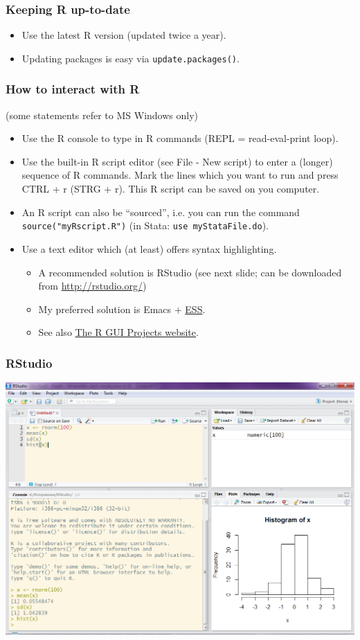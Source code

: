 \documentclass[bigger]{beamer}
\begin{document}
\begin{frame}
\frametitle{Keeping R up-to-date}
\label{sec-2-1-3}

\begin{itemize}
\item Use the latest R version (updated twice a year).
\item Updating packages is easy via \texttt{update.packages()}.
\end{itemize}
\end{frame}
\begin{frame}[shrink=5]
\frametitle{How to interact with R}
\label{sec-2-1-4}

    (some statements refer to MS Windows only)
\begin{itemize}
\item Use the R console to type in R commands (REPL = read-eval-print loop).
\item Use the built-in R script editor (see File - New script) to enter a (longer)
      sequence of R commands. Mark the lines which you want to run and press
      CTRL + r (STRG + r). This R script can be saved on you computer.
\item An R script can also be \enquote{sourced}, i.e. you can run the command
      \texttt{source("myRscript.R")} (in Stata: \texttt{use myStataFile.do}).
\item Use a text editor which (at least) offers syntax highlighting.
\begin{itemize}
\item A recommended solution is RStudio (see next slide; can be downloaded from \href{http://rstudio.org/}{http://rstudio.org/})
\item My preferred solution is Emacs + \href{http://ess.r-project.org/}{ESS}.
\item See also \href{http://www.sciviews.org/_rgui/}{The R GUI Projects website}.
\end{itemize}
\end{itemize}
\end{frame}
\begin{frame}
\frametitle{RStudio}
\label{sec-2-1-5}

    \begin{center}
    \includegraphics[scale = 0.3]{../graph/f_screenshot_rstudio}
    \end{center}
\end{frame}
\end{document}
